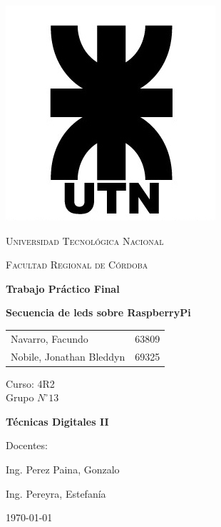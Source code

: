 \documentclass[11pt, a4paper]{article}
\begin{document}
\begin{titlepage}
 \centering
	\includegraphics[scale=0.80]{Imagenes/LOGO.jpg} \par
 	\vspace{1cm}
 	{\scshape\LARGE Universidad Tecnológica Nacional \par}
 	{\scshape\large Facultad Regional de Córdoba \par}
 	\vspace{1cm}
	{\bfseries \Large Trabajo Práctico Final \par}
	{\bfseries \Large Secuencia de leds sobre RaspberryPi \par}
 	\vspace{1.5cm}

	\begin{tabular}{ll}
		Navarro, Facundo			&	63809 	\\
		Nobile, Jonathan Bleddyn	&	69325	
	\end{tabular}
	
	\vspace{1cm}
	Curso: 4R2 \\
	Grupo $N^{\circ} 13$
 	\vfill
	{\bfseries \Large Técnicas Digitales II\par}

	\vspace{1.5cm}
	Docentes: \par
	Ing. Perez Paina, Gonzalo\par
	Ing. Pereyra, Estefanía \par

 	\vfill
	{\large \today\par}
\end{titlepage}
	
\tableofcontents
\clearpage
\end{document}
